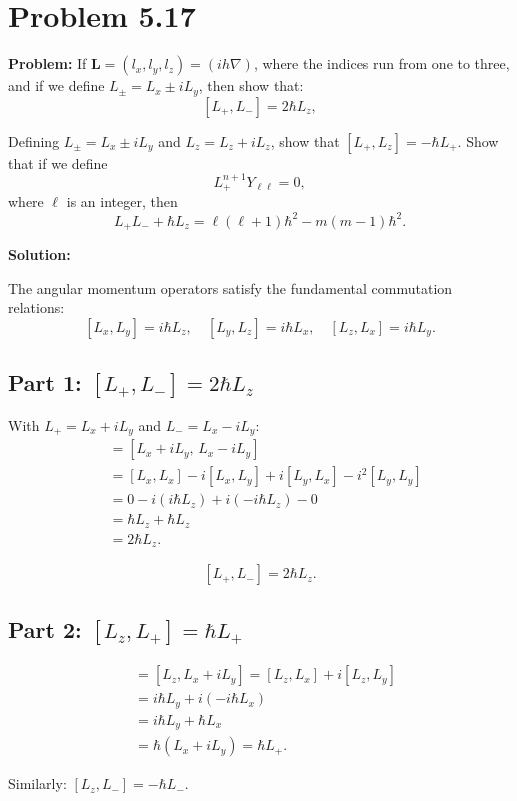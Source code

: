 \documentclass[12pt]{article}
\begin{document}
\section*{Problem 5.17}

\textbf{Problem:} If $\mathbf{L} = (l_x, l_y, l_z) = (ih\nabla)$, where the indices run from one to three, and if we define $L_\pm = L_x \pm iL_y$, then show that:
\[
[L_+, L_-] = 2\hbar L_z,
\]

Defining $L_\pm = L_x \pm iL_y$ and $L_z = L_z + iL_z$, show that $[L_+, L_z] = -\hbar L_+$. Show that if we define
\[
L_+^{n+1}Y_{\ell\ell} = 0,
\]
where $\ell$ is an integer, then
\[
L_+ L_- + \hbar L_z = \ell(\ell+1)\hbar^2 - m(m-1)\hbar^2.
\]

\bigskip
\textbf{Solution:}

The angular momentum operators satisfy the fundamental commutation relations:
\[
[L_x, L_y] = i\hbar L_z, \quad [L_y, L_z] = i\hbar L_x, \quad [L_z, L_x] = i\hbar L_y.
\]

\subsection*{Part 1: $[L_+, L_-] = 2\hbar L_z$}

With $L_+ = L_x + iL_y$ and $L_- = L_x - iL_y$:
\begin{align}
[L_+, L_-] &= [L_x + iL_y,\, L_x - iL_y] \\
&= [L_x, L_x] - i[L_x, L_y] + i[L_y, L_x] - i^2[L_y, L_y] \\
&= 0 - i(i\hbar L_z) + i(-i\hbar L_z) - 0 \\
&= \hbar L_z + \hbar L_z \\
&= 2\hbar L_z.
\end{align}

\[
\boxed{[L_+, L_-] = 2\hbar L_z.}
\]

\subsection*{Part 2: $[L_z, L_+] = \hbar L_+$}

\begin{align}
[L_z, L_+] &= [L_z, L_x + iL_y] = [L_z, L_x] + i[L_z, L_y] \\
&= i\hbar L_y + i(-i\hbar L_x) \\
&= i\hbar L_y + \hbar L_x \\
&= \hbar(L_x + iL_y) = \hbar L_+.
\end{align}

Similarly: $[L_z, L_-] = -\hbar L_-$.
\end{document}
